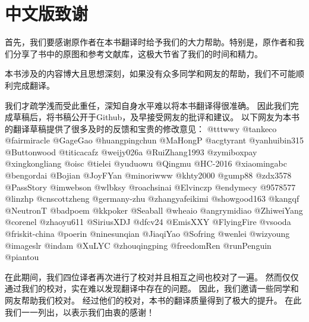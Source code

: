 \chapter*{中文版致谢}

首先，我们要感谢原作者在本书翻译时给予我们的大力帮助。特别是，原作者和我们分享了书中的原图和参考文献库，这极大节省了我们的时间和精力。

本书涉及的内容博大且思想深刻，如果没有众多同学和网友的帮助，我们不可能顺利完成翻译。
 
我们才疏学浅而受此重任，深知自身水平难以将本书翻译得很准确。
因此我们完成草稿后，将书稿公开于Github，及早接受网友的批评和建议。
以下网友为本书的翻译草稿提供了很多及时的反馈和宝贵的修改意见：
@tttwwy @tankeco @fairmiracle @GageGao @huangpingchun @MaHongP @acgtyrant @yanhuibin315 @Buttonwood @titicacafz @weijy026a @RuiZhang1993 @zymiboxpay @xingkongliang 
@oisc @tielei @yuduowu @Qingmu @HC-2016 @xiaomingabc @bengordai @Bojian @JoyFYan @minoriwww @khty2000 @gump88 @zdx3578 @PassStory @imwebson @wlbksy @roachsinai 
@Elvinczp @endymecy @9578577 @linzhp @cnscottzheng @germany-zhu @zhangyafeikimi @showgood163 @kangqf @NeutronT @badpoem @kkpoker @Seaball @wheaio @angrymidiao
@ZhiweiYang @corenel @zhaoyu611 @SiriusXDJ @dfcv24 @EmisXXY @FlyingFire @vsooda @friskit-china @poerin @ninesunqian @JiaqiYao @Sofring @wenlei @wizyoung 
@imageslr @indam @XuLYC @zhouqingping @freedomRen @runPenguin @piantou
 
在此期间，我们四位译者再次进行了校对并且相互之间也校对了一遍。
然而仅仅通过我们的校对，实在难以发现翻译中存在的问题。
因此，我们邀请一些同学和网友帮助我们校对。
经过他们的校对，本书的翻译质量得到了极大的提升。
在此我们一一列出，以表示我们由衷的感谢！
 
